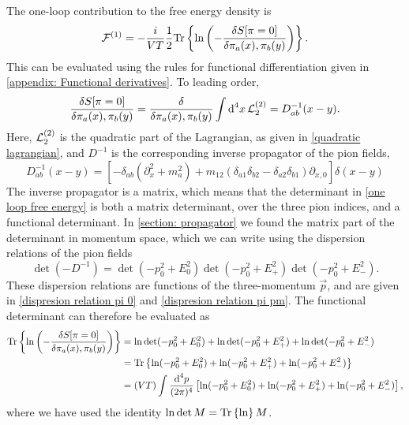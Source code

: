 The one-loop contribution to the free energy density is
%
\begin{equation}
    \label{one loop free energy}
    \Eff^{(1)}
    = - \frac{i}{V T} \frac{1}{2}
    \Tr{\ln\left( -\fdv{S[\pi = 0]}{\pi_a(x), \pi_b(y)} \right)}.
\end{equation}
%
This can be evaluated using the rules for functional differentiation given in \autoref{appendix: Functional derivatives}.
To leading order,
%
\begin{align}
    \fdv{S[\pi = 0]}{\pi_a(x), \pi_b(y)}
    = \fdv{}{\pi_a(x), \pi_b(y)}
    \int \dd^4 x \, \Ell^{(2)}_2
    = D_{ab}^{-1}(x - y).
\end{align}
%
Here, $\mathcal{L}^{(2)}_2$ is the quadratic part of the Lagrangian, as given in \autoref{quadratic lagrangian}, and $D^{-1}$ is the corresponding inverse propagator of the pion fields,
\begin{equation}
    D_{ab}^{-1}(x-y) = 
    \left[
        - \delta_{ab}(\partial_x^2 + m^2_a)
        + m_{12}(\delta_{a1} \delta_{b2} - \delta_{a2}\delta_{b1}) \partial_{x, 0}
    \right] \delta(x-y)
\end{equation}
%
The inverse propagator is a matrix, which means that the determinant in \autoref{one loop free energy} is both a matrix determinant, over the three pion indices, and a functional determinant.
In \autoref{section: propagator} we found the matrix part of the determinant in momentum space, which we can write using the dispersion relations of the pion fields
\begin{equation}
    \det(- D^{-1}) = \det(-p_0^2 + E_0^2) \det(-p_0^2 + E_+^2) \det(-p_0^2 + E_-^2).
\end{equation}
%
These dispersion relations are functions of the three-momentum $\vec p$, and are given in \autoref{dispresion relation pi 0} and \autoref{dispresion relation pi pm}.
The functional determinant can therefore be evaluated as
%
\begin{align}
    \nonumber
    \Tr{\ln\left( -\fdv{S[\pi = 0]}{\pi_a(x), \pi_b(y)} \right)}
    & = \ln \det(-p_0^2 + E_0^2) + \ln \det(-p_0^2 + E_+^2) + \ln \det(-p_0^2 + E_-^2) \\
    \nonumber
    & = \Tr{ \ln(-p_0^2 + E_0^2) + \ln(-p_0^2 + E_+^2)+  \ln(-p_0^2 + E_-^2) } \\
    & = (VT) \int \frac{\dd^4 p}{(2 \pi)^4} 
    \left[ \ln(-p_0^2 + E_0^2) + \ln(-p_0^2 + E_+^2) + \ln(-p_0^2 + E_-^2)  \right],
\end{align}
%
where we have used the identity $\ln\det M = \text{Tr} \left\{ \ln \right\} M $.
